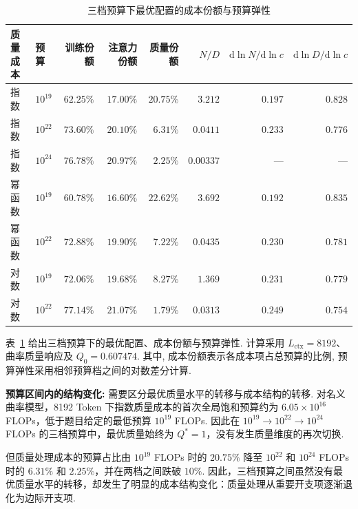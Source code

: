 \begin{table}[htbp]\centering\small
    \caption{三档预算下最优配置的成本份额与预算弹性}\label{tab:q3-v41-transfer}
    \begin{tabular}{llrrrrrr}\toprule
        质量成本 & 预算        & 训练份额      & 注意力份额     & 质量份额               & $N/D$     & $\mathrm{d}\ln N/\mathrm{d}\ln c$ & $\mathrm{d}\ln D/\mathrm{d}\ln c$ \\\midrule
        指数   & $10^{19}$ & $62.25\%$ & $17.00\%$ & $\mathbf{20.75\%}$ & $3.212$   & $0.197$                           & $0.828$                           \\
        指数   & $10^{22}$ & $73.60\%$ & $20.10\%$ & $\mathbf{6.31\%}$  & $0.0411$  & $0.233$                           & $0.776$                           \\
        指数   & $10^{24}$ & $76.78\%$ & $20.97\%$ & $\mathbf{2.25\%}$  & $0.00337$ & ---                               & ---                               \\
        幂函数  & $10^{19}$ & $60.78\%$ & $16.60\%$ & $22.62\%$          & $3.692$   & $0.192$                           & $0.835$                           \\
        幂函数  & $10^{22}$ & $72.88\%$ & $19.90\%$ & $7.22\%$           & $0.0435$  & $0.230$                           & $0.781$                           \\
        对数   & $10^{19}$ & $72.06\%$ & $19.68\%$ & $8.27\%$           & $1.369$   & $0.231$                           & $0.779$                           \\
        对数   & $10^{22}$ & $77.14\%$ & $21.07\%$ & $1.79\%$           & $0.0313$  & $0.249$                           & $0.754$                           \\
        \bottomrule\end{tabular}\end{table}
表~\ref{tab:q3-v41-transfer} 给出三档预算下的最优配置、成本份额与预算弹性. 计算采用 $L_{\mathrm{ctx}}=8192$、曲率质量响应及 $Q_0=0.607474$. 其中, 成本份额表示各成本项占总预算的比例, 预算弹性采用相邻预算档之间的对数差分计算.

\textbf{预算区间内的结构变化:} 需要区分最优质量水平的转移与成本结构的转移. 对名义曲率模型，8192 Token 下指数质量成本的首次全局饱和预算约为 $6.05\times10^{16}$ FLOPs，低于题目给定的最低预算 $10^{19}$ FLOPs. 因此在 $10^{19}\to10^{22}\to10^{24}$ FLOPs 的三档预算中，最优质量始终为 $Q^*=1$，没有发生质量维度的再次切换.

但质量处理成本的预算占比由 $10^{19}$ FLOPs 时的 $20.75\%$ 降至 $10^{22}$ 和 $10^{24}$ FLOPs 时的 $6.31\%$ 和 $2.25\%$，并在两档之间跌破 $10\%$. 因此，三档预算之间虽然没有最优质量水平的转移，却发生了明显的成本结构变化：质量处理从重要开支项逐渐退化为边际开支项.

